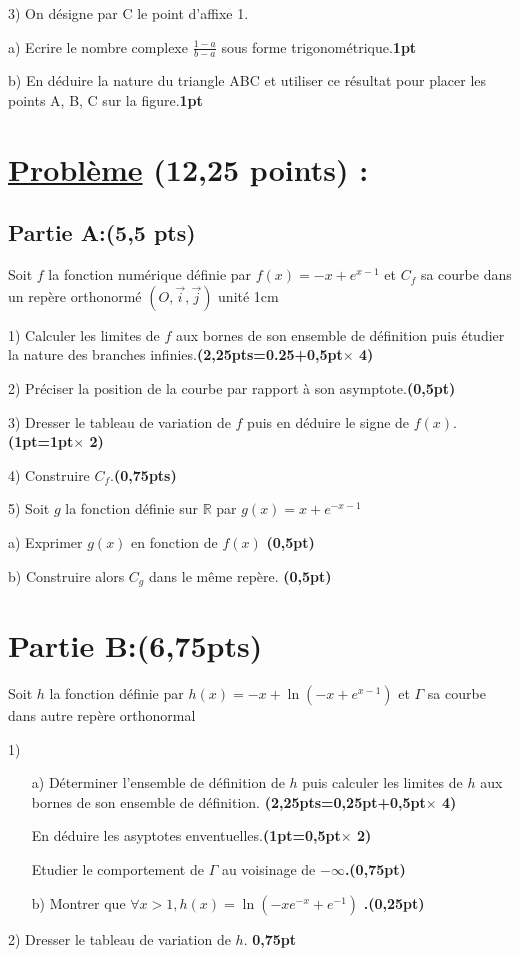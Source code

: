 \documentclass[12pt]{article}
\begin{document}
3) On désigne par C le point d’affixe 1.

a) Ecrire le nombre complexe $\frac{1-a}{b-a}$  sous forme trigonométrique.\textbf{1pt}

b) En déduire la nature du triangle ABC et  utiliser ce résultat pour placer les points A, B, C sur la figure.\textbf{1pt}
\section*{\underline{Problème} (12,25 points) :}
\subsection*{Partie A:(5,5 pts)}
Soit $f$ la fonction numérique définie par $f(x)=-x+e^{x-1}$  et $C_{f}$ sa courbe dans un repère orthonormé $(O,\vec{i},\vec{j})$ unité 1cm

1) Calculer les limites de $f$ aux bornes de son ensemble de définition puis étudier la nature des branches infinies.\textbf{(2,25pts=0.25+0,5pt$\times$ 4)}

2) Préciser la position de la courbe par rapport à son asymptote.\textbf{(0,5pt)}

3) Dresser le tableau de variation de $f$ puis en déduire le signe de $f(x)$.\textbf{(1pt=1pt$\times$ 2)}

4) Construire $C_{f}$.\textbf{(0,75pts)}

5) Soit $g$ la fonction définie sur $\mathbb{R}$ par $g(x)=x+e^{-x-1}$

  a) Exprimer $g(x)$ en fonction de $f(x)$ \textbf{(0,5pt)}
  
  b) Construire alors $C_{g}$ dans le même repère.  \textbf{(0,5pt)}
\section*{Partie B:(6,75pts)}
Soit $h$ la fonction définie par $h(x)=-x+\ln(-x+e^{x-1})$  et $\Gamma$ sa courbe dans autre repère orthonormal

1)
\begin{itemize}
	\item[a)] Déterminer l’ensemble de définition de $h$ puis calculer les limites de $h$ aux bornes de son ensemble de définition. \textbf{(2,25pts=0,25pt+0,5pt$\times$ 4)}
	\item[] En déduire les asyptotes enventuelles.\textbf{(1pt=0,5pt$\times$ 2)}
	\item[]Etudier le comportement de  $\Gamma$ au voisinage de $-\infty$\textbf{.(0,75pt)}

	\item[b)]Montrer que $\forall x>1, h(x)=\ln(-xe^{-x}+e^{-1}) $ \textbf{.(0,25pt)}
\end{itemize}
2) Dresser le tableau de variation de  $h$.   \textbf{0,75pt}
    
\end{document}
